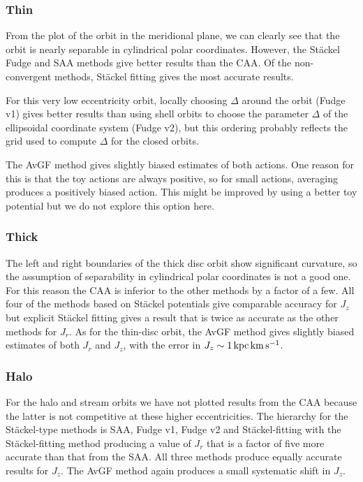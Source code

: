 \documentclass[useAMS,usenatbib,fleqn,a4paper]{mn2e}
\def\kpc{\,{\rm kpc}}
\def\kms{\,{\rm km\,s^{-1}}}
\begin{document}
\subsubsection{Thin}

From the plot of the orbit in the meridional plane, we can clearly see that
the orbit is nearly separable in cylindrical polar coordinates. However, the
St\"ackel Fudge and SAA  methods give better results than the CAA. Of the
non-convergent methods, St\"ackel fitting gives the most accurate results.

For this very low eccentricity orbit, locally choosing $\Delta$ around the
orbit (Fudge v1) gives better results than using shell orbits to choose the
parameter $\Delta$ of the ellipsoidal coordinate system (Fudge v2), but this
ordering probably reflects the grid used to compute $\Delta$ for the closed
orbits.

The AvGF method gives slightly biased estimates of both actions. One
reason for this is that the toy actions are always positive, so for small
actions, averaging produces a positively biased action.  This might be improved
by using a better toy potential but we do not explore this option here.

\subsubsection{Thick}

The left and right boundaries of the thick disc orbit show significant
curvature, so the assumption of separability in cylindrical polar coordinates
is not a good one. For this reason the CAA is inferior to
the other methods by a factor of a few. All four of the methods based on
St\"ackel potentials give comparable accuracy for $J_z$ but explicit St\"ackel
fitting gives a result that is twice as  accurate as the other methods for
$J_r$. As for the thin-disc orbit, the AvGF method gives slightly
biased estimates of both $J_r$ and $J_z$, with the error in $J_z\sim
1\kpc\kms$.

\subsubsection{Halo}

For the halo and stream orbits we have not plotted results from the CAA
because the latter is not competitive at these higher eccentricities.  The
hierarchy for the St\"ackel-type methods is SAA, Fudge v1, Fudge v2 and
St\"ackel-fitting with the St\"ackel-fitting method producing a value of
$J_r$ that is a factor of five more accurate than that from the SAA.  All
three methods produce equally accurate results for $J_z$. The AvGF
method again produces a small systematic shift in $J_z$.
\end{document}

